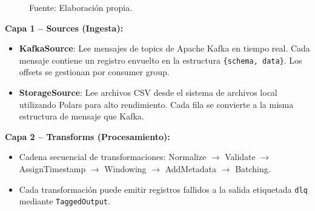 \documentclass[12pt,a4paper]{article}
\renewcommand{\footnotesize}{\fontsize{10pt}{12pt}\selectfont}
\begin{document}
\begin{figure}[H]
    {\footnotesize Fuente: Elaboración propia.}
\end{figure}

\textbf{Capa 1 -- Sources (Ingesta):}
\begin{itemize}
    \item \textbf{KafkaSource}: Lee mensajes de topics de Apache Kafka en tiempo real. Cada mensaje contiene un registro envuelto en la estructura \texttt{\{schema, data\}}. Los offsets se gestionan por consumer group.
    \item \textbf{StorageSource}: Lee archivos CSV desde el sistema de archivos local utilizando Polars para alto rendimiento. Cada fila se convierte a la misma estructura de mensaje que Kafka.
\end{itemize}

\textbf{Capa 2 -- Transforms (Procesamiento):}
\begin{itemize}
    \item Cadena secuencial de transformaciones: Normalize $\rightarrow$ Validate $\rightarrow$ AssignTimestamp $\rightarrow$ Windowing $\rightarrow$ AddMetadata $\rightarrow$ Batching.
    \item Cada transformación puede emitir registros fallidos a la salida etiquetada \texttt{dlq} mediante \texttt{TaggedOutput}.
\end{itemize}
\end{document}
